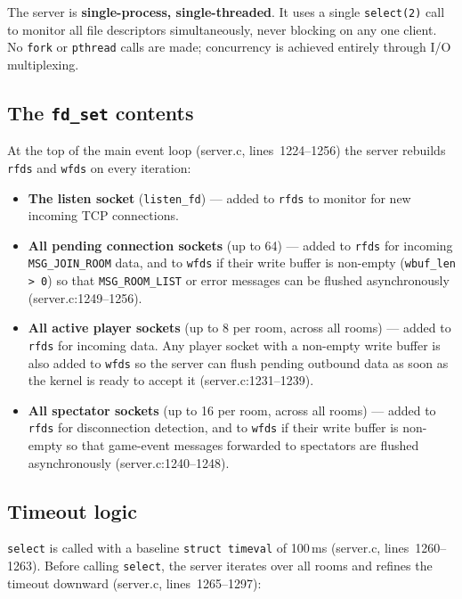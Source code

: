 \documentclass[11pt,letterpaper]{article}
\begin{document}
The server is \textbf{single-process, single-threaded}. It uses a single \texttt{select(2)} call to monitor all file descriptors simultaneously, never blocking on any one client. No \texttt{fork} or \texttt{pthread} calls are made; concurrency is achieved entirely through I/O multiplexing.

\subsection*{The \texttt{fd\_set} contents}

At the top of the main event loop (server.c, lines~1224--1256) the server rebuilds \texttt{rfds} and \texttt{wfds} on every iteration:

\begin{itemize}[leftmargin=2em]
    \item \textbf{The listen socket} (\texttt{listen\_fd}) --- added to \texttt{rfds} to monitor for new incoming TCP connections.
    \item \textbf{All pending connection sockets} (up to 64) --- added to \texttt{rfds} for incoming \texttt{MSG\_JOIN\_ROOM} data, and to \texttt{wfds} if their write buffer is non-empty (\texttt{wbuf\_len > 0}) so that \texttt{MSG\_ROOM\_LIST} or error messages can be flushed asynchronously (server.c:1249--1256).
    \item \textbf{All active player sockets} (up to 8 per room, across all rooms) --- added to \texttt{rfds} for incoming data. Any player socket with a non-empty write buffer is also added to \texttt{wfds} so the server can flush pending outbound data as soon as the kernel is ready to accept it (server.c:1231--1239).
    \item \textbf{All spectator sockets} (up to 16 per room, across all rooms) --- added to \texttt{rfds} for disconnection detection, and to \texttt{wfds} if their write buffer is non-empty so that game-event messages forwarded to spectators are flushed asynchronously (server.c:1240--1248).
\end{itemize}

\subsection*{Timeout logic}

\texttt{select} is called with a baseline \texttt{struct timeval} of 100\,ms (server.c, lines~1260--1263). Before calling \texttt{select}, the server iterates over all rooms and refines the timeout downward (server.c, lines~1265--1297):
\end{document}
